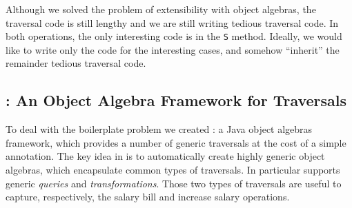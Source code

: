

Although we solved the problem of extensibility with object
algebras, the traversal code is still lengthy and we are still writing
tedious traversal code. In both operations, the only interesting code
is in the \lstinline{S} method. Ideally, we would like to write only
the code for the interesting cases, and somehow ``inherit'' the
remainder tedious traversal code.


\subsection{\Name: An Object Algebra Framework for Traversals}

To deal with the boilerplate problem we created \Name: a Java object
algebras framework, which provides a number of generic traversals at
the cost of a simple annotation. The key idea in \name is to
automatically create highly generic object algebras, which encapsulate
common types of traversals. In particular \name supports generic
\emph{queries} and \emph{transformations}. Those two types of
traversals are useful to capture, respectively, the salary bill and
increase salary operations.

